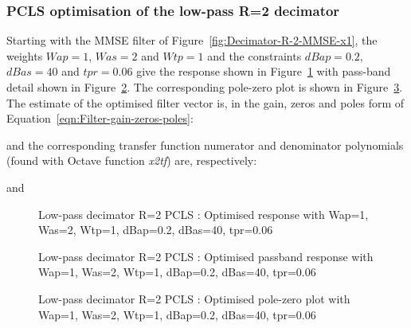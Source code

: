 \documentclass[a4paper,twoside,10pt,english]{report}
\begin{document}
\subsubsection{PCLS optimisation of the low-pass  R=2 decimator}
Starting with the MMSE filter of Figure~\ref{fig:Decimator-R-2-MMSE-x1},
the weights $Wap=1$, $Was=2$ and $Wtp=1$ and the constraints $dBap=0.2$, 
$dBas=40$ and $tpr=0.06$ give the response shown in
Figure~\ref{fig:Decimator-R-2-PCLS-d1} with pass-band detail 
shown in Figure~\ref{fig:Decimator-R-2-PCLS-d1-passband}. The corresponding 
pole-zero plot is shown in Figure~\ref{fig:Decimator-R-2-PCLS-d1-pz}.
The estimate of the optimised filter vector is, in the gain, zeros and 
poles form of Equation~\ref{eqn:Filter-gain-zeros-poles}:
\begin{small}

\end{small}
and the corresponding transfer function numerator and denominator polynomials
(found with Octave function \emph{x2tf}) are, respectively:
\begin{small}

\end{small}
and
\begin{small}

\end{small}
\begin{figure}[!htbp]
\begin{center}
\scalebox{0.7}{}
\caption{Low-pass decimator R=2 PCLS : Optimised response with Wap=1, Was=2, Wtp=1, dBap=0.2, dBas=40, tpr=0.06}
\label{fig:Decimator-R-2-PCLS-d1}
\end{center}
\end{figure}
\begin{figure}[!htbp]
\begin{center}
\scalebox{0.7}{}
\caption{Low-pass decimator R=2 PCLS : Optimised passband response with Wap=1, Was=2, Wtp=1, dBap=0.2, dBas=40, tpr=0.06}
\label{fig:Decimator-R-2-PCLS-d1-passband}
\end{center}
\end{figure}
\begin{figure}[!htbp]
\begin{center}
\scalebox{0.7}{}
\caption{Low-pass decimator R=2 PCLS : Optimised pole-zero plot with Wap=1, Was=2, Wtp=1, dBap=0.2, dBas=40, tpr=0.06}
\label{fig:Decimator-R-2-PCLS-d1-pz}
\end{center}
\end{figure}
\clearpage
\end{document}
